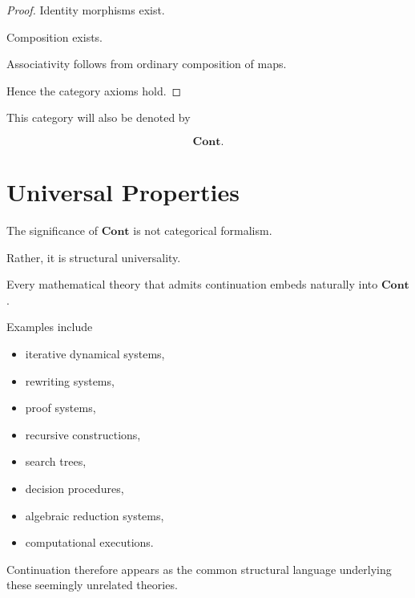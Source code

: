 \documentclass[13pt,openany]{book}
\theoremstyle{plain}
\theoremstyle{definition}
\begin{document}
\begin{proof}

Identity morphisms exist.

Composition exists.

Associativity follows from ordinary composition of maps.

Hence the category axioms hold.
\end{proof}

This category will also be denoted by

\[
\mathbf{Cont}.
\]


\section{Universal Properties}

The significance of $\mathbf{Cont}$ is not categorical formalism.

Rather, it is structural universality.

Every mathematical theory that admits continuation embeds naturally into
$\mathbf{Cont}$.

Examples include

\begin{itemize}

\item iterative dynamical systems,

\item rewriting systems,

\item proof systems,

\item recursive constructions,

\item search trees,

\item decision procedures,

\item algebraic reduction systems,

\item computational executions.

\end{itemize}

Continuation therefore appears as the common structural language underlying
these seemingly unrelated theories.

\end{document}
